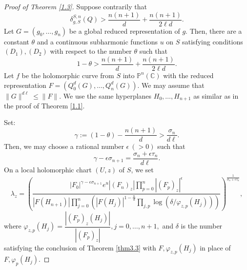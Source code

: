\documentclass[12pt,article]{amsart}
\newcommand{\C}{{\mathbb{C}}}
\renewcommand{\P}{{\mathbb{P}}}
\numberwithin{equation}{section}
\begin{document}
\begin{proof}[Proof of Theorem \ref{1.3}]
 Suppose contrarily that
$$\delta^{S,n}_{g,S}(Q)>\frac{n(n+1)}{d}+\frac{n(n+1)}{2\ell d}.$$
Let $G=(g_0,\ldots,g_n)$ be a global reduced representation of $g$.  Then, there are a constant $\theta$ and a continuous subharmonic functions $u$ on $S$ satisfying conditions $(D_1),(D_2)$ with respect to the number $\theta$ such that
$$1-\theta> \frac{n(n+1)}{d}+\frac{n(n+1)}{2\ell d}.$$
Let $f$ be the holomorphic curve from $S$ into $\P^n(\C)$ with the reduced representation $F=(Q_0^d(G),\ldots,Q_n^d(G))$. We may assume that $\|G\|^{d\ell}\le \|F\|.$ We use the same hyperplanes $H_0,\ldots,H_{n+1}$ as similar as in the proof of Theorem \ref{1.1}.

%  
% 
Set:
$$\gamma:= (1-\theta)-\frac{n(n+1)}{d}>\frac{\sigma_n}{d\ell}.$$
Then, we may choose a rational number $\epsilon\ (>0)$ such that
$$\gamma-\epsilon\sigma_{n+1}=\frac{\sigma_n+\epsilon\tau_n}{d\ell}.$$
On a local holomorphic chart $(U,z)$ of $S$, we set
$$ \lambda_z=\left( \dfrac{|F_{0}|^{\gamma-\epsilon\sigma_{n+1}}e^{u}|(F_n)_z|\prod_{p=0}^{n}|(F_{p})_z|^{\epsilon}}{|F(H_{n+1})|\prod_{j=0}^n(|F(H_j)|^{1-\frac{n}{d}}\prod_{j,p}\log (\delta/\varphi_{z,p}(H_j)))}\right )^{\frac{1}{\sigma_n+\epsilon\tau_n}},$$
where $\varphi_{z,p}(H_j)=\dfrac{|(F_{p})_z(H_j)|}{|(F_{p})_z|}, j=0,\ldots,n+1,$ and $\delta$ is the number satisfying the conclusion of Theorem \ref{thm3.3} with $F,\varphi_{z,p}(H_j)$ in place of $F,\varphi_{p}(H_j)$.


\end{proof}
\end{document}
